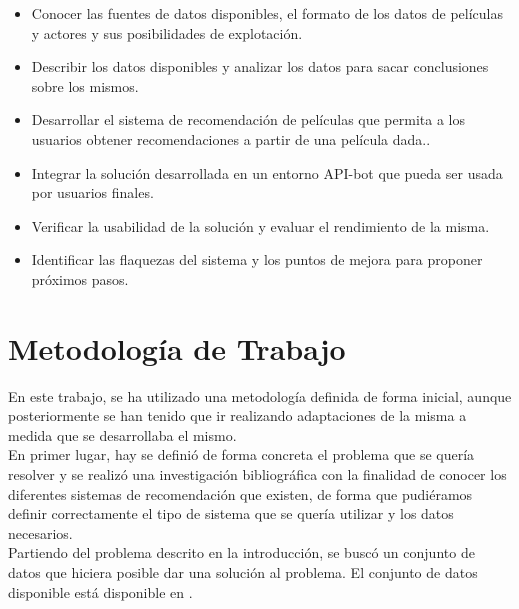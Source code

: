 \begin{itemize}
    \item Conocer las fuentes de datos disponibles, el formato de los datos de películas y actores y sus posibilidades de explotación.
    \item Describir los datos disponibles y analizar los datos para sacar conclusiones sobre los mismos.
    \item Desarrollar el sistema de recomendación de películas que permita a los usuarios obtener recomendaciones a partir de una película dada..
    \item Integrar la solución desarrollada en un entorno API-bot que pueda ser usada por usuarios finales.
    \item Verificar la usabilidad de la solución y evaluar el rendimiento de la misma.
    \item Identificar las flaquezas del sistema y los puntos de mejora para proponer próximos pasos.
\end{itemize}

\section{Metodología de Trabajo}\label{sec:metodología}

En este trabajo, se ha utilizado una metodología definida de forma inicial, aunque posteriormente se han tenido que ir realizando adaptaciones de la misma a medida que se desarrollaba el mismo.\\

En primer lugar, hay se definió de forma concreta el problema que se quería resolver y se realizó una investigación bibliográfica con la finalidad de conocer los diferentes sistemas de recomendación que existen, de forma que pudiéramos definir correctamente el tipo de sistema que se quería utilizar y los datos necesarios.\\

Partiendo del problema descrito en la introducción, se buscó un conjunto de datos que hiciera posible dar una solución al problema. El conjunto de datos disponible está disponible en \cite{kaggle}.\\

